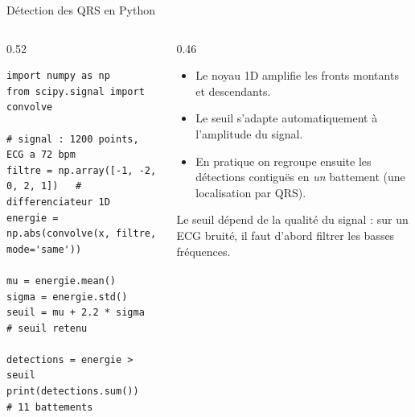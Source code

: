 \begin{frame}[fragile]{Détection des QRS en Python}
\begin{columns}[t]
\begin{column}{0.52\textwidth}
\begin{codebox}
\begin{lstlisting}
import numpy as np
from scipy.signal import convolve

# signal : 1200 points, ECG a 72 bpm
filtre = np.array([-1, -2, 0, 2, 1])   # differenciateur 1D
energie = np.abs(convolve(x, filtre, mode='same'))

mu = energie.mean()
sigma = energie.std()
seuil = mu + 2.2 * sigma          # seuil retenu

detections = energie > seuil
print(detections.sum())           # 11 battements
\end{lstlisting}
\end{codebox}
\end{column}
\begin{column}{0.46\textwidth}
\begin{itemize}
  \item Le noyau 1D \py{[-1, -2, 0, 2, 1]} amplifie les fronts montants
  et descendants.
  \item Le seuil  s'adapte automatiquement à
  l'amplitude du signal.
  \item En pratique on regroupe ensuite les détections contiguës en
  \emph{un} battement (une localisation par QRS).
\end{itemize}
\begin{wbox}[Variabilité]
Le seuil dépend de la qualité du signal : sur un ECG bruité, il faut
d'abord filtrer les basses fréquences.
\end{wbox}
\end{column}
\end{columns}
\end{frame}

